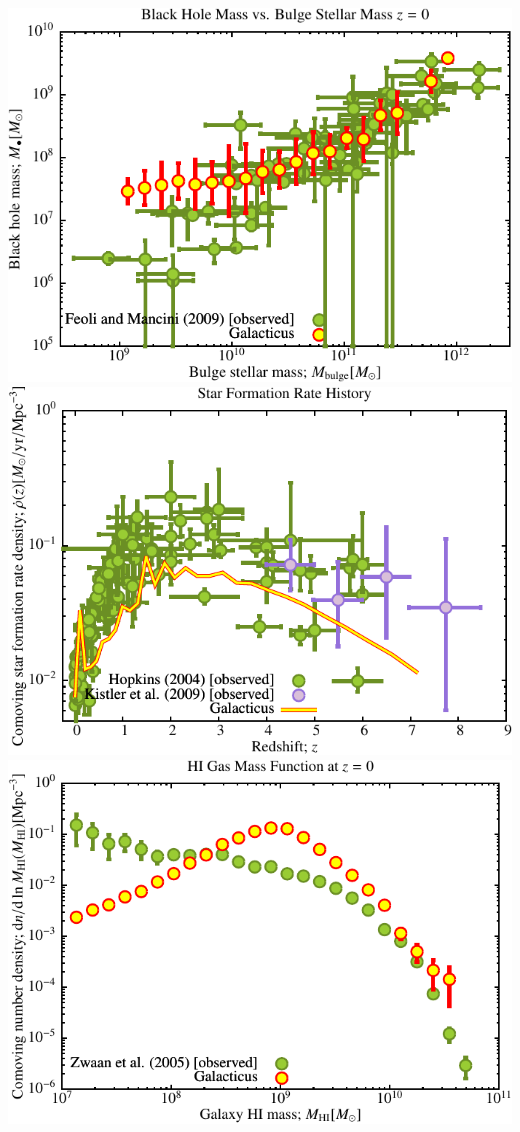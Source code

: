 \includegraphics[scale=0.6]{r256/h70/red_st14_log2/Plot_Black_Hole_vs_Bulge_Mass.pdf}
\includegraphics[scale=0.6]{r256/h70/red_st14_log2/Plot_Star_Formation_History.pdf} \\
\includegraphics[scale=0.6]{r256/h70/red_st14_log2/Plot_HI_Mass_Function.pdf}


